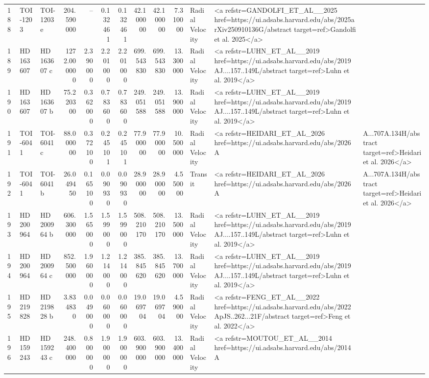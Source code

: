 \begin{tabular}{lllrrrrrrrll}
188 & TOI-1203 & TOI-1203 e & 204.590000 & -- & 0.132461 & 0.132461 & 42.100000 & 42.100000 & 7.310000 & Radial Velocity & <a refstr=GANDOLFI_ET_AL__2025 href=https://ui.adsabs.harvard.edu/abs/2025arXiv250910136G/abstract target=ref>Gandolfi et al. 2025</a> \\
189 & HD 163607 & HD 163607 c & 1272.000000 & 2.390000 & 2.201000 & 2.201000 & 699.543830 & 699.543830 & 13.300000 & Radial Velocity & <a refstr=LUHN_ET_AL__2019 href=https://ui.adsabs.harvard.edu/abs/2019AJ....157..149L/abstract target=ref>Luhn et al. 2019</a> \\
190 & HD 163607 & HD 163607 b & 75.220300 & 0.362000 & 0.783600 & 0.783600 & 249.051588 & 249.051588 & 13.900000 & Radial Velocity & <a refstr=LUHN_ET_AL__2019 href=https://ui.adsabs.harvard.edu/abs/2019AJ....157..149L/abstract target=ref>Luhn et al. 2019</a> \\
191 & TOI-6041 & TOI-6041 c & 88.000000 & 0.372100 & 0.245101 & 0.245101 & 77.900000 & 77.900000 & 10.500000 & Radial Velocity & <a refstr=HEIDARI_ET_AL_2026 href=https://ui.adsabs.harvard.edu/abs/2026A&A...707A.134H/abstract target=ref>Heidari et al. 2026</a> \\
192 & TOI-6041 & TOI-6041 b & 26.049450 & 0.165100 & 0.090930 & 0.090930 & 28.900000 & 28.900000 & 4.550000 & Transit & <a refstr=HEIDARI_ET_AL_2026 href=https://ui.adsabs.harvard.edu/abs/2026A&A...707A.134H/abstract target=ref>Heidari et al. 2026</a> \\
193 & HD 200964 & HD 200964 b & 606.300000 & 1.565000 & 1.599000 & 1.599000 & 508.210170 & 508.210170 & 13.500000 & Radial Velocity & <a refstr=LUHN_ET_AL__2019 href=https://ui.adsabs.harvard.edu/abs/2019AJ....157..149L/abstract target=ref>Luhn et al. 2019</a> \\
194 & HD 200964 & HD 200964 c & 852.500000 & 1.960000 & 1.214000 & 1.214000 & 385.845620 & 385.845620 & 13.700000 & Radial Velocity & <a refstr=LUHN_ET_AL__2019 href=https://ui.adsabs.harvard.edu/abs/2019AJ....157..149L/abstract target=ref>Luhn et al. 2019</a> \\
195 & HD 219828 & HD 219828 b & 3.834830 & 0.049000 & 0.060000 & 0.060000 & 19.069704 & 19.069704 & 4.590000 & Radial Velocity & <a refstr=FENG_ET_AL__2022 href=https://ui.adsabs.harvard.edu/abs/2022ApJS..262...21F/abstract target=ref>Feng et al. 2022</a> \\
196 & HD 159243 & HD 159243 c & 248.400000 & 0.800000 & 1.900000 & 1.900000 & 603.900000 & 603.900000 & 13.400000 & Radial Velocity & <a refstr=MOUTOU_ET_AL__2014 href=https://ui.adsabs.harvard.edu/abs/2014A%

\end{tabular}
